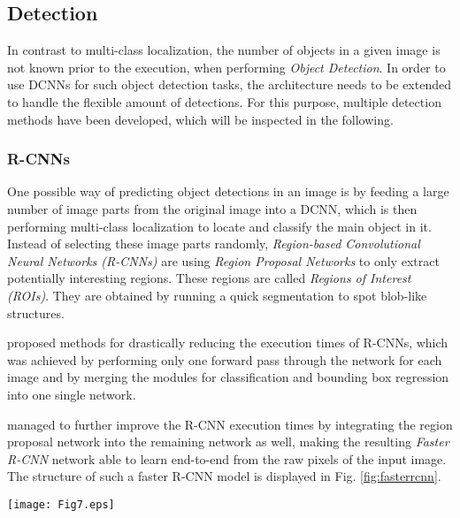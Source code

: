 \documentclass[conference]{IEEEtran}
\begin{document}
\subsection{Detection}
In contrast to multi-class localization, the number of objects in a given image is not known prior to the execution, when performing \emph{Object Detection}. In order to use DCNNs for such object detection tasks, the architecture needs to be extended to handle the flexible amount of detections. For this purpose, multiple detection methods have been developed, which will be inspected in the following.

\subsubsection{R-CNNs}
One possible way of predicting object detections in an image is by feeding a large number of image parts from the original image into a DCNN, which is then performing multi-class localization to locate and classify the main object in it. Instead of selecting these image parts randomly, \emph{Region-based Convolutional Neural Networks (R-CNNs)} \cite{RCNN} are using \emph{Region Proposal Networks} to only extract potentially interesting regions. These regions are called \emph{Regions of Interest (ROIs)}. They are obtained by running a quick segmentation to spot blob-like structures. 

\cite{FastRCNN} proposed methods for drastically reducing the execution times of R-CNNs, which was achieved by performing only one forward pass through the network for each image and by merging the modules for classification and bounding box regression into one single network.

 \cite{FasterRCNN} managed to further improve the R-CNN execution times by integrating the region proposal network into the remaining network as well, making the resulting \emph{Faster R-CNN} network able to learn end-to-end from the raw pixels of the input image. The structure of such a faster R-CNN model is displayed in Fig. \ref{fig:fasterrcnn}.

\begin{figure*}
\texttt{[image: Fig7.eps]}
\caption{A faster R-CNN architecture for object detection. A region proposal network is using the features computed in the network stem to produce ROIs, on which classification and bounding box regression are performed}
\label{fig:fasterrcnn}
\end{figure*}
\end{document}
